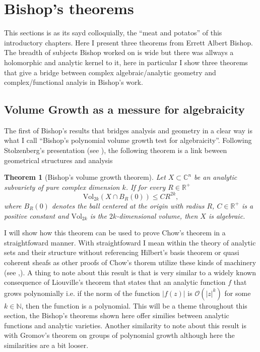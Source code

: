 \documentclass[12pt,twoside,a4paper]{report}
\newtheorem{theorem}{Theorem}[section]
\newcommand{\nat}{\ensuremath{ \mathbb N }}
\newcommand{\re}{\ensuremath{\mathbb R }}
\newcommand{\con}{\ensuremath{\mathbb{C}^n}}
\newcommand{\osheaf}{\ensuremath{\mathcal O }}
\begin{document}
\section{Bishop's theorems}
\noindent This sections is as its sayd colloquially, the ``meat and potatos'' of this introductory chapters. Here I present three theorems from Errett Albert Bishop. The breadth of subjects Bishop worked on is wide but there was allways a holomorphic and analytic kernel to it, here in particular I show three theorems that give a bridge between complex algebraic/analytic geometry and complex/functional analyis in Bishop's work.
\subsection{Volume Growth as a messure for algebraicity}

\noindent The first of Bishop's results that bridges analysis and geometry in a clear way is what I call ``Bishop's polynomial volume growth test for algebraicity''. Following Stolzenberg's presentation (see \cite{Stolzenberg}), the following theorem is a link beween geometrical structures and analysis
\begin{theorem}[Bishop's volume growth theorem]\label{Bishop1}
        Let $X\subset\con$ be an analytic subvariety of pure complex dimension $k$. If for every $R\in\re^+$
        \[
          \textrm{Vol}_{2k}(X\cap B_R(0))\leq CR^{2k},
        \]
        where $B_R(0)$ denotes the ball centered at the origin with radius $R$, $C\in\re^{+}$ is a positive constant
        and $\textrm{Vol}_{2k}$ is the $2k$-dimensional volume, then $X$ is algebraic.
\end{theorem}

I will show how this theorem can be used to prove Chow's theorem in a straightfoward manner. With straightfoward I mean within the theory of analytic sets and their structure without referencing Hilbert's basis theorem or quasi coherent sheafs as other proofs of Chow's thorem utilize these kinds of machinery (see \cite{GAGA},\cite{chow-proofs}). A thing to note about this result is that is very similar to a widely known consequence of Liouville's theorem that states that an analytic function $f$ that grows polynomially i.e. if the norm of the function $|f(z)|$ is $\osheaf(|z|^{k})$ for some $k\in\nat$, then the function is a polynomial. This will be a theme throughout this section, the Bishop's theorems shown here offer similies between analytic functions and analytic varieties. Another similarity to note about this result is with Gromov's theorem on groups of polynomial growth although here the similarities are a bit looser.
\end{document}
